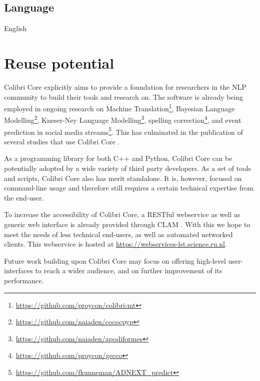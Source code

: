 \subsection*{Language}

English

\section{Reuse potential}

Colibri Core explicitly aims to provide a foundation for researchers in the NLP
community to build their tools and research on. The software is already being
employed in ongoing research on Machine
Translation\footnote{\url{https://github.com/proycon/colibri-mt}}, Bayesian Language
Modelling\footnote{\url{https://github.com/naiaden/cococpyp}}, Kneser-Ney Language
Modelling\footnote{\url{https://github.com/naiaden/apodiformes}}, spelling
correction\footnote{\url{https://github.com/proycon/gecco}}, and event
prediction in social media streams\footnote{\url{https://github.com/fkunneman/ADNEXT\_predict}}.
This has culminated in the publication of several studies that use Colibri Core
\citep{COLIBRITAPILOT,COCOCPYP,Kunneman+16}.

As a programming library for both C++ and Python, Colibri Core can be
potentially adopted by a wide variety of third party developers. As a set of
tools and scripts, Colibri Core also has merit standalone. It is, however,
focused on command-line usage and therefore still requires a certain technical
expertise from the end-user.

To increase the accessibility of Colibri Core, a RESTful webservice as well as
generic web interface is already provided through CLAM \citep{CLAMPAPER}. With this we
hope to meet the needs of less technical end-users, as well as automated
networked clients. This webservice is hosted at
\url{https://webservices-lst.science.ru.nl}.

Future work building upon Colibri Core may focus on offering
high-level user-interfaces to reach a wider audience, and on further
improvement of its performance.

